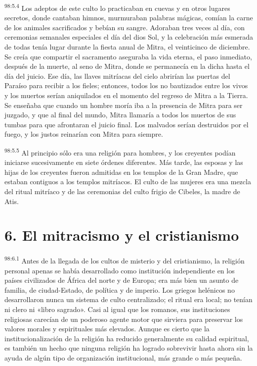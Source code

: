 \par
\textsuperscript{98:5.4} Los adeptos de este culto lo practicaban en cuevas y en otros lugares secretos, donde cantaban himnos, murmuraban palabras mágicas, comían la carne de los animales sacrificados y bebían su sangre. Adoraban tres veces al día, con ceremonias semanales especiales el día del dios Sol, y la celebración más esmerada de todas tenía lugar durante la fiesta anual de Mitra, el veinticinco de diciembre. Se creía que compartir el sacramento aseguraba la vida eterna, el paso inmediato, después de la muerte, al seno de Mitra, donde se permanecía en la dicha hasta el día del juicio. Ese día, las llaves mitríacas del cielo abrirían las puertas del Paraíso para recibir a los fieles; entonces, todos los no bautizados entre los vivos y los muertos serían aniquilados en el momento del regreso de Mitra a la Tierra. Se enseñaba que cuando un hombre moría iba a la presencia de Mitra para ser juzgado, y que al final del mundo, Mitra llamaría a todos los muertos de sus tumbas para que afrontaran el juicio final. Los malvados serían destruidos por el fuego, y los justos reinarían con Mitra para siempre.

\par
\textsuperscript{98:5.5} Al principio sólo era una religión para hombres, y los creyentes podían iniciarse sucesivamente en siete órdenes diferentes. Más tarde, las esposas y las hijas de los creyentes fueron admitidas en los templos de la Gran Madre, que estaban contiguos a los templos mitríacos. El culto de las mujeres era una mezcla del ritual mitríaco y de las ceremonias del culto frigio de Cibeles, la madre de Atis.

\section*{6. El mitracismo y el cristianismo}
\par
\textsuperscript{98:6.1} Antes de la llegada de los cultos de misterio y del cristianismo, la religión personal apenas se había desarrollado como institución independiente en los países civilizados de África del norte y de Europa; era más bien un asunto de familia, de ciudad-Estado, de política y de imperio. Los griegos helénicos no desarrollaron nunca un sistema de culto centralizado; el ritual era local; no tenían ni clero ni «libro sagrado». Casi al igual que los romanos, sus instituciones religiosas carecían de un poderoso agente motor que sirviera para preservar los valores morales y espirituales más elevados. Aunque es cierto que la institucionalización de la religión ha reducido generalmente su calidad espiritual, es también un hecho que ninguna religión ha logrado sobrevivir hasta ahora sin la ayuda de algún tipo de organización institucional, más grande o más pequeña.

